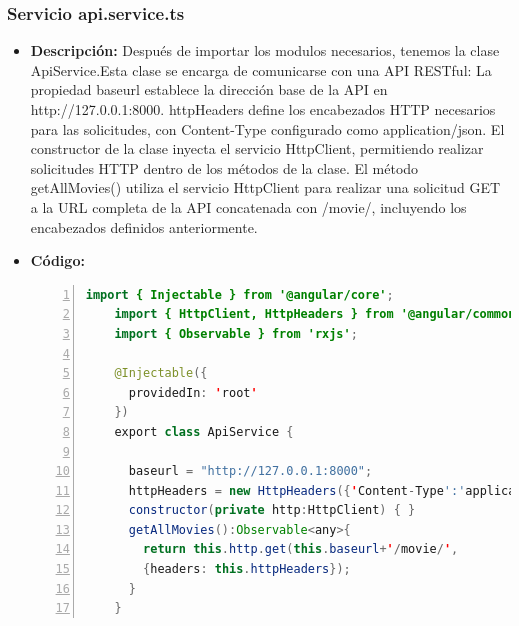 \documentclass{article}
\begin{document}
  \subsubsection{Servicio api.service.ts}
  \begin{itemize}
    \item \textbf{Descripción: }Después de importar los modulos necesarios, tenemos la clase ApiService.Esta clase se 
    encarga de comunicarse con una API RESTful: La propiedad baseurl establece 
    la dirección base de la API en http://127.0.0.1:8000. httpHeaders define los encabezados HTTP necesarios para 
    las solicitudes, con Content-Type configurado como application/json. El constructor de la clase inyecta el 
    servicio HttpClient, permitiendo realizar solicitudes HTTP dentro de los métodos de la clase. El método getAllMovies() 
    utiliza el servicio HttpClient para realizar una solicitud GET a la URL completa de la API concatenada con /movie/, incluyendo los encabezados definidos anteriormente.
    \item \textbf{Código: }
    \begin{lstlisting}[language=java, numbers=left, firstnumber=1, numberstyle=\color{black}]
    import { Injectable } from '@angular/core';
    import { HttpClient, HttpHeaders } from '@angular/common/http';
    import { Observable } from 'rxjs';

    @Injectable({
      providedIn: 'root'
    })
    export class ApiService {

      baseurl = "http://127.0.0.1:8000";
      httpHeaders = new HttpHeaders({'Content-Type':'application/json'});
      constructor(private http:HttpClient) { }
      getAllMovies():Observable<any>{
        return this.http.get(this.baseurl+'/movie/', 
        {headers: this.httpHeaders});
      }
    }
    \end{lstlisting}
  \end{itemize}
\end{document}
